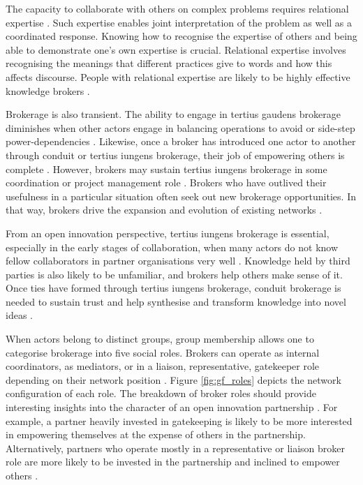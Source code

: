 The capacity to collaborate with others on complex problems requires relational expertise \citep{edwards2017working}. Such expertise enables joint interpretation of the problem as well as a coordinated response. Knowing how to recognise the expertise of others and being able to demonstrate one's own expertise is crucial. Relational expertise involves recognising the meanings that different practices give to words and how this affects discourse. People with relational expertise are likely to be highly effective knowledge brokers \citep{grigoriou2014structural, edwards2017working}. \medskip

Brokerage is also transient. The ability to engage in tertius gaudens brokerage diminishes when other actors engage in balancing operations to avoid or side-step power-dependencies \citep{emerson1962power}. Likewise, once a broker has introduced one actor to another through conduit or tertius iungens brokerage, their job of empowering others is complete \citep{obstfeld2014brokerage}. However, brokers may sustain tertius iungens brokerage in some coordination or project management role \citep{grosser2019measuring}. Brokers who have outlived their usefulness in a particular situation often seek out new brokerage opportunities. In that way, brokers drive the expansion and evolution of existing networks \citep{obstfeld2014brokerage,quintane2016brokers}. \medskip

From an open innovation perspective, tertius iungens brokerage is essential, especially in the early stages of collaboration, when many actors do not know fellow collaborators in partner organisations very well \citep{fleming2007collaborative}. Knowledge held by third parties is also likely to be unfamiliar, and brokers help others make sense of it. Once ties have formed through tertius iungens brokerage, conduit brokerage is needed to sustain trust and help synthesise and transform knowledge into novel ideas \citep{quintane2016brokers}. \medskip 

When actors belong to distinct groups, group membership allows one to categorise brokerage into five social roles. Brokers can operate as internal coordinators, as mediators, or in a liaison, representative, gatekeeper role depending on their network position \citep{gould1989structures}. Figure \ref{fig:gf_roles} depicts the network configuration of each role. The breakdown of broker roles should provide interesting insights into the character of an open innovation partnership \citep{spiro2013extended}. For example, a partner heavily invested in gatekeeping is likely to be more interested in empowering themselves at the expense of others in the partnership. Alternatively, partners who operate mostly in a representative or liaison broker role are more likely to be invested in the partnership and inclined to empower others \citep{spiro2013extended}. \medskip

